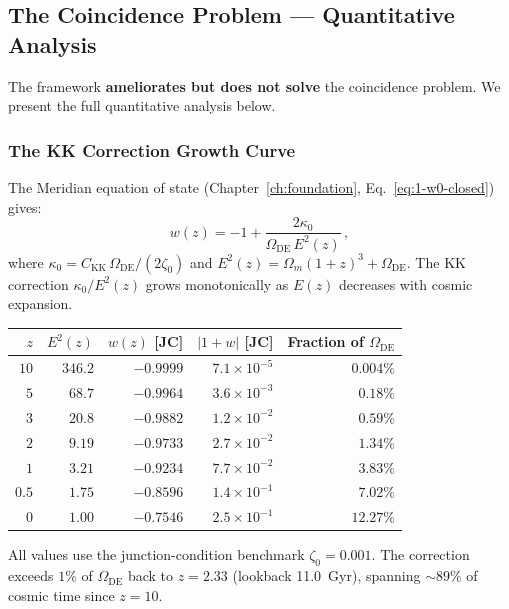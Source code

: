 \subsection{The Coincidence Problem --- Quantitative Analysis}
\label{app:coincidence}

The framework \textbf{ameliorates but does not solve} the coincidence problem. We present the full quantitative analysis below.

\subsubsection{The KK Correction Growth Curve}

The Meridian equation of state (Chapter~\ref{ch:foundation}, Eq.~\ref{eq:1-w0-closed}) gives:
\begin{equation}
  w(z) = -1 + \frac{2\kappa_0}{\Omega_{\mathrm{DE}}\,E^2(z)}\,,
  \label{eq:app-coinc-wz}
\end{equation}
where $\kappa_0 = C_\mathrm{KK}\,\Omega_{\mathrm{DE}}/(2\zeta_0)$ and $E^2(z) = \Omega_m(1+z)^3 + \Omega_{\mathrm{DE}}$. The KK correction $\kappa_0/E^2(z)$ grows monotonically as $E(z)$ decreases with cosmic expansion.

\begin{center}
\small
\begin{tabular}{r r r r r}
\hline
$z$ & $E^2(z)$ & $w(z)$ [JC] & $|1+w|$ [JC] & Fraction of $\Omega_{\mathrm{DE}}$ \\
\hline
$10$ &  $346.2$  & $-0.9999$  & $7.1 \times 10^{-5}$ & $0.004\%$ \\
$5$  &  $68.7$   & $-0.9964$  & $3.6 \times 10^{-3}$ & $0.18\%$ \\
$3$  &  $20.8$   & $-0.9882$  & $1.2 \times 10^{-2}$ & $0.59\%$ \\
$2$  &  $9.19$   & $-0.9733$  & $2.7 \times 10^{-2}$ & $1.34\%$ \\
$1$  &  $3.21$   & $-0.9234$  & $7.7 \times 10^{-2}$ & $3.83\%$ \\
$0.5$ & $1.75$   & $-0.8596$  & $1.4 \times 10^{-1}$ & $7.02\%$ \\
$0$  &  $1.00$   & $-0.7546$  & $2.5 \times 10^{-1}$ & $12.27\%$ \\
\hline
\end{tabular}
\end{center}

\noindent
All values use the junction-condition benchmark $\zeta_0 = 0.001$. The correction exceeds $1\%$ of $\Omega_{\mathrm{DE}}$ back to $z = 2.33$ (lookback 11.0~Gyr), spanning ${\sim}89\%$ of cosmic time since $z = 10$.

